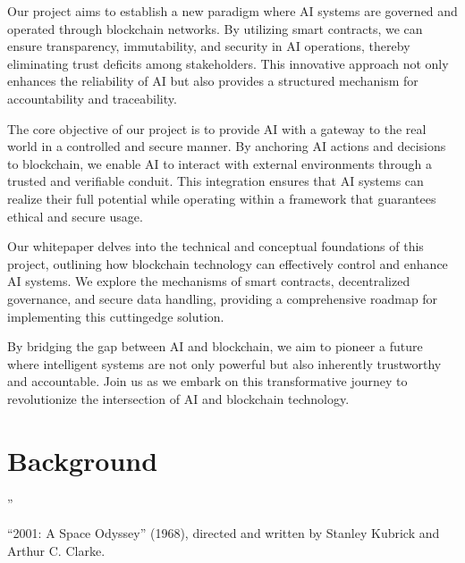 \documentclass[a4paper,12pt,english]{sphinxmanual}
\begin{document}
\sphinxAtStartPar
Our project aims to establish a new paradigm where AI systems are
governed and operated through blockchain networks. By utilizing smart
contracts, we can ensure transparency, immutability, and security in AI
operations, thereby eliminating trust deficits among stakeholders. This
innovative approach not only enhances the reliability of AI but also
provides a structured mechanism for accountability and traceability.

\sphinxAtStartPar
The core objective of our project is to provide AI with a gateway to the
real world in a controlled and secure manner. By anchoring AI actions
and decisions to blockchain, we enable AI to interact with external
environments through a trusted and verifiable conduit. This integration
ensures that AI systems can realize their full potential while operating
within a framework that guarantees ethical and secure usage.

\sphinxAtStartPar
Our whitepaper delves into the technical and conceptual foundations of
this project, outlining how blockchain technology can effectively
control and enhance AI systems. We explore the mechanisms of smart
contracts, decentralized governance, and secure data handling, providing
a comprehensive roadmap for implementing this cutting\sphinxhyphen{}edge solution.

\sphinxAtStartPar
By bridging the gap between AI and blockchain, we aim to pioneer a
future where intelligent systems are not only powerful but also
inherently trustworthy and accountable. Join us as we embark on this
transformative journey to revolutionize the intersection of AI and
blockchain technology.


\chapter{Background}
\label{\detokenize{index:background}}
\sphinxAtStartPar
{}” %
\begin{footnote}[2]\sphinxAtStartFootnote
“2001: A Space Odyssey” (1968), directed and written by Stanley Kubrick and Arthur C. Clarke.
%
\end{footnote}
\end{document}
